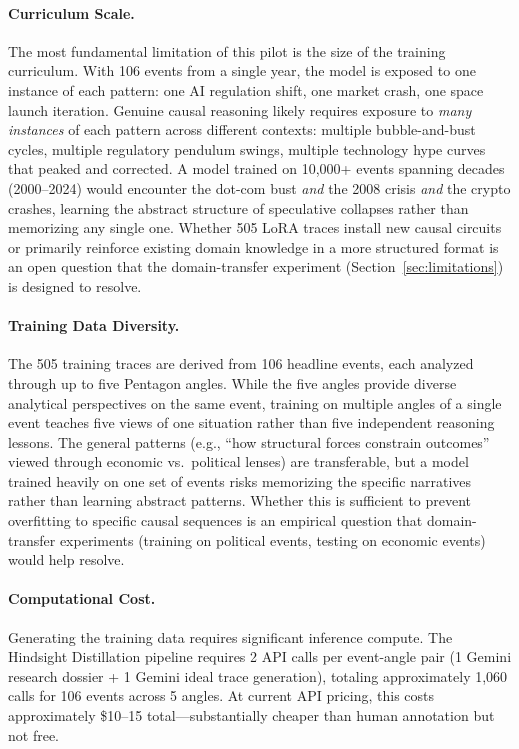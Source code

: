 \documentclass[11pt,a4paper]{article}
\begin{document}
\paragraph{Curriculum Scale.}
The most fundamental limitation of this pilot is the size of the training curriculum. With 106 events from a single year, the model is exposed to one instance of each pattern: one AI regulation shift, one market crash, one space launch iteration. Genuine causal reasoning likely requires exposure to \textit{many instances} of each pattern across different contexts: multiple bubble-and-bust cycles, multiple regulatory pendulum swings, multiple technology hype curves that peaked and corrected. A model trained on 10,000+ events spanning decades (2000--2024) would encounter the dot-com bust \textit{and} the 2008 crisis \textit{and} the crypto crashes, learning the abstract structure of speculative collapses rather than memorizing any single one. Whether 505 LoRA traces install new causal circuits or primarily reinforce existing domain knowledge in a more structured format is an open question that the domain-transfer experiment (Section~\ref{sec:limitations}) is designed to resolve.

\paragraph{Training Data Diversity.}
The 505 training traces are derived from 106 headline events, each analyzed through up to five Pentagon angles. While the five angles provide diverse analytical perspectives on the same event, training on multiple angles of a single event teaches five views of one situation rather than five independent reasoning lessons. The general patterns (e.g., ``how structural forces constrain outcomes'' viewed through economic vs.\ political lenses) are transferable, but a model trained heavily on one set of events risks memorizing the specific narratives rather than learning abstract patterns. Whether this is sufficient to prevent overfitting to specific causal sequences is an empirical question that domain-transfer experiments (training on political events, testing on economic events) would help resolve.

\paragraph{Computational Cost.}
Generating the training data requires significant inference compute. The Hindsight Distillation pipeline requires 2 API calls per event-angle pair (1 Gemini research dossier + 1 Gemini ideal trace generation), totaling approximately 1,060 calls for 106 events across 5 angles. At current API pricing, this costs approximately \$10--15 total---substantially cheaper than human annotation but not free.
\end{document}
